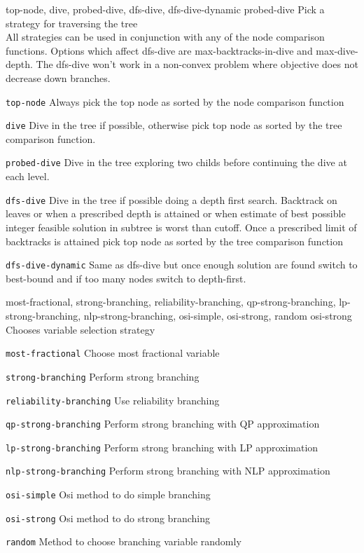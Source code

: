 %
{\ttfamily top-node, dive, probed-dive, dfs-dive, dfs-dive-dynamic}%
{probed-dive}%
{Pick a strategy for traversing the tree\\
All strategies can be used in conjunction with any of the node comparison functions. Options which affect dfs-dive are max-backtracks-in-dive and max-dive-depth. The dfs-dive won't work in a non-convex problem where objective does not decrease down branches.}%
{\begin{list}{}{
\setlength{\parsep}{0em}
\setlength{\leftmargin}{5ex}
\setlength{\labelwidth}{2ex}
\setlength{\itemindent}{0ex}
\setlength{\topsep}{0pt}}
\item[\texttt{top-node}]  Always pick the top node as sorted by the node comparison function
\item[\texttt{dive}] Dive in the tree if possible, otherwise pick top node as sorted by the tree comparison function.
\item[\texttt{probed-dive}] Dive in the tree exploring two childs before continuing the dive at each level.
\item[\texttt{dfs-dive}] Dive in the tree if possible doing a depth first search. Backtrack on leaves or when a prescribed depth is attained or when estimate of best possible integer feasible solution in subtree is worst than cutoff. Once a prescribed limit of backtracks is attained pick top node as sorted by the tree comparison function
\item[\texttt{dfs-dive-dynamic}] Same as dfs-dive but once enough solution are found switch to best-bound and if too many nodes switch to depth-first.
\end{list}
}

%
{\ttfamily most-fractional, strong-branching, reliability-branching, qp-strong-branching, lp-strong-branching, nlp-strong-branching, osi-simple, osi-strong, random}%
{osi-strong}%
{Chooses variable selection strategy}%
{\begin{list}{}{
\setlength{\parsep}{0em}
\setlength{\leftmargin}{5ex}
\setlength{\labelwidth}{2ex}
\setlength{\itemindent}{0ex}
\setlength{\topsep}{0pt}}
\item[\texttt{most-fractional}] Choose most fractional variable
\item[\texttt{strong-branching}] Perform strong branching
\item[\texttt{reliability-branching}] Use reliability branching
\item[\texttt{qp-strong-branching}] Perform strong branching with QP approximation
\item[\texttt{lp-strong-branching}] Perform strong branching with LP approximation
\item[\texttt{nlp-strong-branching}] Perform strong branching with NLP approximation
\item[\texttt{osi-simple}] Osi method to do simple branching
\item[\texttt{osi-strong}] Osi method to do strong branching
\item[\texttt{random}] Method to choose branching variable randomly
\end{list}
}

